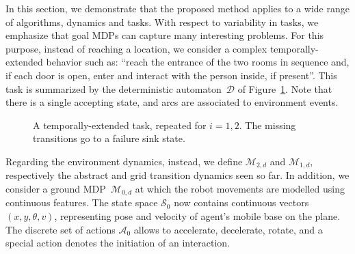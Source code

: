 \documentclass[letterpaper]{article} %
\theoremstyle{plain}
\theoremstyle{definition}
\theoremstyle{remark}
\newcommand{\SetSym}[1]{\mathcal{#1}}
\newcommand{\States}{\SetSym{S}}
\newcommand{\Actions}{\SetSym{A}}
\newcommand{\Model}{\SetSym{M}}
\newcommand{\Automa}{\mathcal{D}}
\begin{document}
In this section, we demonstrate that the proposed method applies to a wide range of algorithms, dynamics and tasks.
With respect to variability in tasks, we emphasize that goal MDPs can capture many interesting problems.
For this purpose, instead of reaching a location, we consider a complex temporally-extended behavior such as:
``reach the entrance of the two rooms in sequence and, if each door is open, enter and interact with the person inside, if present''.
This task is summarized by the deterministic automaton~$\Automa$ of Figure~\ref{fig:office-automa}.
Note that there is a single accepting state, and arcs are associated to environment events.
\begin{figure}
    \centering
		\caption{A temporally-extended task, repeated for $i = 1, 2$.
		The missing transitions go to a failure sink state.}
    \label{fig:office-automa}
\end{figure}

Regarding the environment dynamics, instead, we define $\Model_{2,d}$ and $\Model_{1,d}$, respectively the abstract and grid transition dynamics seen so far.
In addition, we consider a ground MDP~$\Model_{0,d}$ at which the robot movements are modelled using continuous features.
The state space $\States_0$ now contains continuous vectors $(x, y, \theta, v)$,
representing pose and velocity of agent's mobile base on the plane.
The discrete set of actions $\Actions_0$ allows to accelerate, decelerate, rotate, and a special action denotes the initiation of an interaction.
\end{document}
